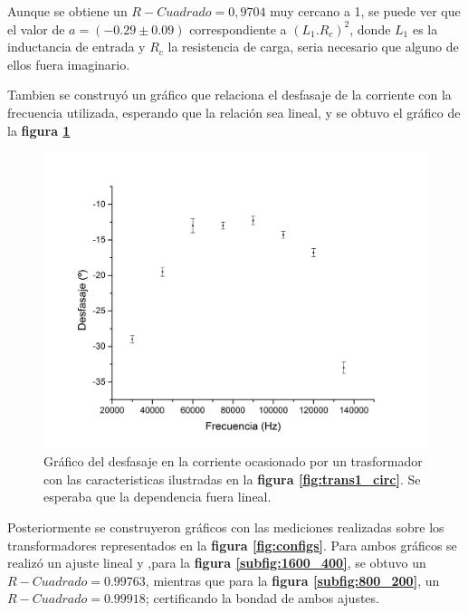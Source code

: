 \documentclass[11pt,a4paper]{article}
\begin{document}
Aunque se obtiene un $R-Cuadrado = 0,9704$ muy cercano a 1, se puede ver que el valor de $a= (-0.29 \pm 0.09)$ correspondiente a $(L_{1}.R_{c})^2$, donde $L_{1}$ es la inductancia de entrada y $R_{c}$ la resistencia de carga, seria necesario que alguno de ellos fuera imaginario.

Tambien se construyó un gráfico que relaciona el desfasaje de la corriente con la frecuencia utilizada, esperando que la relación sea lineal, y se obtuvo el gráfico de la \textbf{figura \ref{fig:Tr1-Des}}

\begin{figure}[H]
	\centering
	\includegraphics[scale=0.4]{Desfasaje_vs_frecuencia}
	\caption{Gráfico del desfasaje en la corriente ocasionado por un trasformador con las caracteristicas ilustradas en la \textbf{figura \ref{fig:trans1_circ}}. Se esperaba que la dependencia fuera lineal.}
	\label{fig:Tr1-Des}
\end{figure}

Posteriormente se construyeron gráficos con las mediciones realizadas sobre los transformadores representados en la \textbf{figura \ref{fig:configs}}.
Para ambos gráficos se realizó un ajuste lineal y ,para la \textbf{figura \ref{subfig:1600_400}}, se obtuvo un $R-Cuadrado = 0.99763$, mientras que para la \textbf{figura \ref{subfig:800_200}}, un $R-Cuadrado = 0.99918$; certificando la bondad de ambos ajustes.
\end{document}
